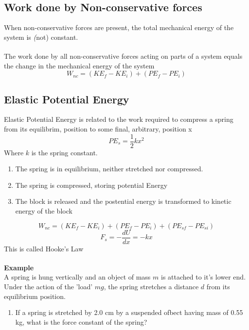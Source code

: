 \documentclass[]{article}
\begin{document}
\subsection*{Work done by Non-conservative forces}
When non-conservative forces are present, the total mechanical energy of the system is \textit(not) constant.\\
\\
The work done by all non-conservative forces acting on parts of a system equals the change in the mechanical energy of the system\\
\begin{equation*}
    W_{nc} = (KE_f-KE_i)+(PE_f-PE_i)
\end{equation*}

\subsection*{Elastic Potential Energy}
Elastic Potential Energy is related to the work required to compress a spring from its equilibrim, position to some final, arbitrary, position x
\begin{equation*}
    PE_s = \frac{1}{2}kx^2
\end{equation*}
Where $k$ is the spring constant.
\begin{enumerate}
    \item The spring is in equilibrium, neither stretched nor compressed.
    \item The spring is compressed, storing potential Energy
    \item The block is released and the postential energy is transformed to kinetic energy of the block
\end{enumerate}

\begin{equation*}
    W_{nc} = (KE_f-KE_i)+(PE_f-PE_i)+(PE_{sf}-PE_{si})
\end{equation*}
\begin{equation*}
    F_s = -\frac{dU}{dx} = -kx
\end{equation*}
This is called Hooke's Law\\
\\
\textbf{Example}\\
A spring is hung vertically and an object of mass $m$ is attached to it's lower end. Under the action of the 'load' $mg$, the spring stretches a distance $d$ from its equilibrium position.\\

\begin{enumerate}
    \item If a spring is stretched by 2.0 cm by a suspended ofbect having mass of 0.55 kg, what is the force constant of the spring?
\end{enumerate}
\end{document}
